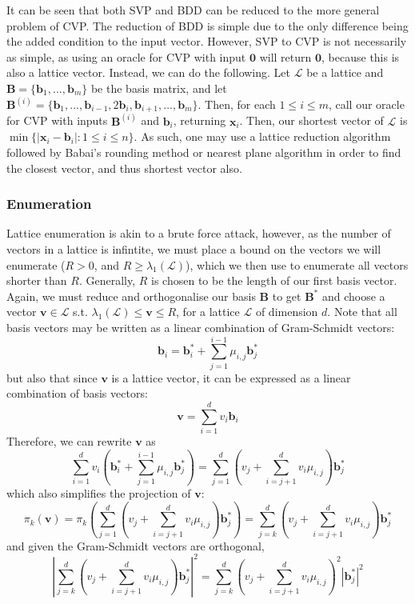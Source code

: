 \documentclass[a4paper, 10pt]{article}
\theoremstyle{definition}
\begin{document}
It can be seen that both \ac{SVP} and \ac{BDD} can be reduced to the more general problem of \ac{CVP}. The reduction of \ac{BDD} is simple due to the only difference being the added condition to the input vector. However, \ac{SVP} to \ac{CVP} is not necessarily as simple, as using an oracle for \ac{CVP} with input $\mathbf{0}$ will return $\mathbf{0}$, because this is also a lattice vector. Instead, we can do the following. Let $\mathcal{L}$ be a lattice and $\mathbf{B}=\{\mathbf{b}_1,...,\mathbf{b}_m\}$ be the basis matrix, and let $\mathbf{B}^{(i)}=\{\mathbf{b}_1,...,\mathbf{b}_{i-1}, 2\mathbf{b}_{i},\mathbf{b}_{i+1},...,\mathbf{b}_m\}$. Then, for each $1 \leq i \leq m$, call our oracle for CVP with inputs $\mathbf{B}^{(i)}$ and $\mathbf{b}_i$, returning $\mathbf{x}_i$. Then, our shortest vector of $\mathcal{L}$ is $\min\{|\mathbf{x}_i - \mathbf{b}_i| : 1 \leq i \leq n\}$. As such, one may use a lattice reduction algorithm followed by Babai's rounding method or nearest plane algorithm in order to find the closest vector, and thus shortest vector also.

\subsubsection{Enumeration}

Lattice enumeration is akin to a brute force attack, however, as the number of vectors in a lattice is infintite, we must place a bound on the vectors we will enumerate ($R>0$, and $R\geq \lambda_1(\mathcal{L})$), which we then use to enumerate all vectors shorter than $R$. Generally, $R$ is chosen to be the length of our first basis vector. Again, we must reduce and orthogonalise our basis $\mathbf{B}$ to get $\mathbf{B}^*$ and choose a vector $\mathbf{v}\in\mathcal{L}$ s.t. $\lambda_1(\mathcal{L}) \leq \mathbf{v} \leq R$, for a lattice $\mathcal{L}$ of dimension $d$. Note that all basis vectors may be written as a linear combination of Gram-Schmidt vectors:
\[\mathbf{b}_i = \mathbf{b}_i^* + \sum_{j=1}^{i-1}\mu_{i,j}\mathbf{b}_j^*\]
but also that since $\mathbf{v}$ is a lattice vector, it can be expressed as a linear combination of basis vectors:
\[\mathbf{v} = \sum_{i=1}^{d}v_i\mathbf{b}_i\]
Therefore, we can rewrite $\mathbf{v}$ as
\[\sum_{i=1}^{d}v_i(\mathbf{b}_i^* + \sum_{j=1}^{i-1}\mu_{i,j}\mathbf{b}_j^*) = \sum_{j=1}^{d}(v_j + \sum_{i=j+1}^{d}v_i\mu_{i,j})\mathbf{b}_j^*\]
which also simplifies the projection of $\mathbf{v}$:
\[\pi_k(\mathbf{v}) = \pi_k(\sum_{j=1}^{d}(v_j + \sum_{i=j+1}^{d}v_i\mu_{i,j})\mathbf{b}_j^*) = \sum_{j=k}^{d}(v_j + \sum_{i=j+1}^{d}v_i\mu_{i,j})\mathbf{b}_j^*\]
and given the Gram-Schmidt vectors are orthogonal,
\[\left\lvert \sum_{j=k}^{d}(v_j + \sum_{i=j+1}^{d}v_i\mu_{i,j})\mathbf{b}_j^*\right\rvert^2= \sum_{j=k}^{d}(v_j + \sum_{i=j+1}^{d}v_i\mu_{i,j})^2|\mathbf{b}_j^*|^2\]
\end{document}
